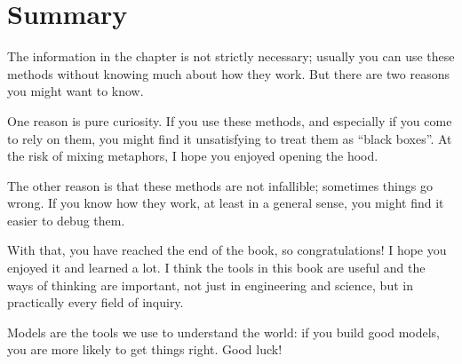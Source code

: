 \section{Summary}

The information in the chapter is not strictly necessary; usually you can use these methods without knowing much about how they work.  But there are two reasons you might want to know.

One reason is pure curiosity.  If you use these methods, and especially if you come to rely on them, you might find it unsatisfying to treat them as ``black boxes''.  At the risk of mixing metaphors, I hope you enjoyed opening the hood.

The other reason is that these methods are not infallible; sometimes things go wrong.  If you know how they work, at least in a general sense, you might find it easier to debug them.

With that, you have reached the end of the book, so congratulations!  I hope you enjoyed it and learned a lot.  I think the tools in this book are useful and the ways of thinking are important, not just in engineering and science, but in practically every field of inquiry.

Models are the tools we use to understand the world: if you build good models, you are more likely to get things right.  Good luck!